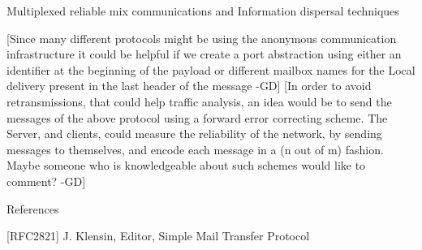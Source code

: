 Multiplexed reliable mix communications and Information dispersal techniques

[Since many different protocols might be using the anonymous
  communication infrastructure it could be helpful if we create a port
  abstraction using either an identifier at the beginning of the
  payload or different mailbox names for the Local delivery present in
  the last header of the message -GD] 
[In order to avoid retransmissions, that could help traffic analysis,
  an idea would be to send the messages of the above protocol using a
  forward error correcting scheme. The Server, and clients, could
  measure the reliability of the network, by sending messages to
  themselves, and encode each message in a (n out of m) fashion. Maybe
  someone who is knowledgeable about such schemes would like to comment? -GD]

References

[RFC2821] J. Klensin, Editor, Simple Mail Transfer Protocol


